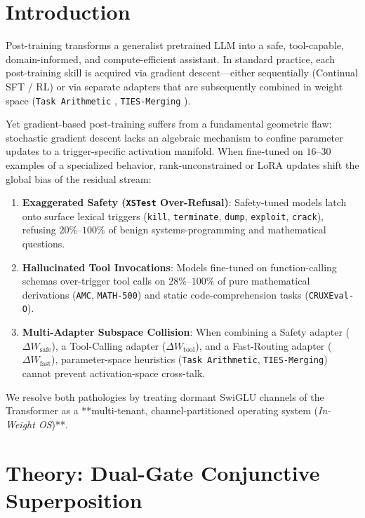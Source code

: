 \documentclass[10pt,twocolumn]{article}
\begin{document}
\section{Introduction}

Post-training transforms a generalist pretrained LLM into a safe, tool-capable, domain-informed, and compute-efficient assistant. In standard practice, each post-training skill is acquired via gradient descent---either sequentially (Continual SFT / RL) or via separate adapters that are subsequently combined in weight space (\texttt{Task Arithmetic} \cite{ilharco2023}, \texttt{TIES-Merging} \cite{yadav2023}).

Yet gradient-based post-training suffers from a fundamental geometric flaw: stochastic gradient descent lacks an algebraic mechanism to confine parameter updates to a trigger-specific activation manifold. When fine-tuned on $16\text{--}30$ examples of a specialized behavior, rank-unconstrained or LoRA updates shift the global bias of the residual stream:
\begin{enumerate}
    \item \textbf{Exaggerated Safety (\texttt{XSTest} Over-Refusal)}: Safety-tuned models latch onto surface lexical triggers (\texttt{kill}, \texttt{terminate}, \texttt{dump}, \texttt{exploit}, \texttt{crack}), refusing $20\%\text{--}100\%$ of benign systems-programming and mathematical questions.
    \item \textbf{Hallucinated Tool Invocations}: Models fine-tuned on function-calling schemas over-trigger tool calls on $28\%\text{--}100\%$ of pure mathematical derivations (\texttt{AMC}, \texttt{MATH-500}) and static code-comprehension tasks (\texttt{CRUXEval-O}).
    \item \textbf{Multi-Adapter Subspace Collision}: When combining a Safety adapter ($\Delta W_{\mathrm{safe}}$), a Tool-Calling adapter ($\Delta W_{\mathrm{tool}}$), and a Fast-Routing adapter ($\Delta W_{\mathrm{fast}}$), parameter-space heuristics (\texttt{Task Arithmetic}, \texttt{TIES-Merging}) cannot prevent activation-space cross-talk.
\end{enumerate}

We resolve both pathologies by treating dormant SwiGLU channels of the Transformer as a **multi-tenant, channel-partitioned operating system (\emph{In-Weight OS})**.

\section{Theory: Dual-Gate Conjunctive Superposition}
\end{document}
